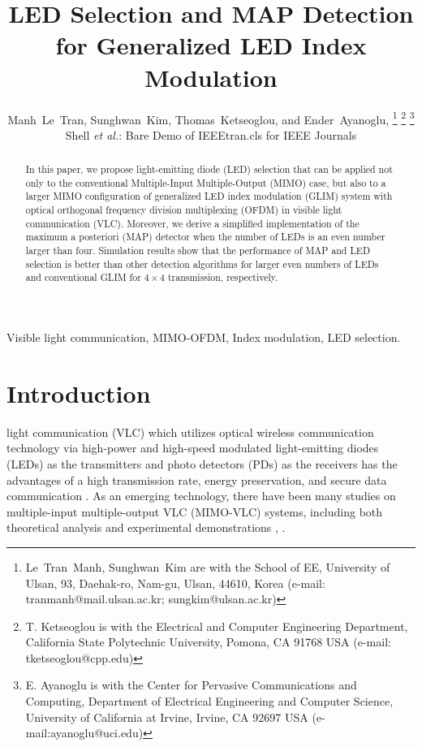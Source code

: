 \documentclass[12pt,letterpaper]{IEEEtran}
\begin{document}
	\title{LED Selection and MAP Detection for Generalized LED Index Modulation }
\author{Manh~Le~Tran, Sunghwan~Kim, Thomas~Ketseoglou,  and Ender~Ayanoglu, %
	\thanks{Le~Tran~Manh, Sunghwan~Kim are with  the  School  of  EE,  University  of  Ulsan,  93, Daehak-ro, Nam-gu, Ulsan, 44610, Korea (e-mail: tranmanh@mail.ulsan.ac.kr; sungkim@ulsan.ac.kr)}%
	\thanks{T. Ketseoglou is with the Electrical and Computer Engineering Department, California State Polytechnic University, Pomona, CA 91768 USA (e-mail: tketseoglou@cpp.edu)}%
	\thanks{E. Ayanoglu is with the Center for Pervasive Communications and Computing, Department of Electrical Engineering and Computer Science, University of California at Irvine, Irvine, CA 92697 USA (e-mail:ayanoglu@uci.edu)}%
	
	{Shell \MakeLowercase{\textit{et al.}}: Bare Demo of IEEEtran.cls for IEEE Journals}}	
\maketitle	
\begin{abstract}
In this paper, we propose light-emitting diode (LED) selection that can be applied not only to the conventional Multiple-Input Multiple-Output (MIMO) case, but also to a larger MIMO configuration of generalized LED index modulation (GLIM) system with optical orthogonal frequency division multiplexing (OFDM) in visible light communication (VLC). Moreover, we derive a simplified implementation of the maximum a posteriori (MAP) detector when the number of LEDs is an even number larger than four. Simulation results show that the performance of MAP and LED selection is better than other detection algorithms for larger even numbers of LEDs and conventional GLIM for $4\times4$ transmission, respectively.
\end{abstract}
\begin{IEEEkeywords}
	Visible light communication, MIMO-OFDM, Index modulation, LED selection.
\end{IEEEkeywords}
\IEEEpeerreviewmaketitle
\section{Introduction}
 light communication (VLC) which utilizes optical wireless communication technology via high-power and high-speed modulated light-emitting diodes (LEDs) as the transmitters and photo detectors (PDs) as the receivers has the advantages of a high transmission rate, energy preservation, and secure data communication \cite{komine_fundamental_2004}. As an emerging technology, there have been many studies on multiple-input multiple-output VLC (MIMO-VLC) systems, including both theoretical analysis and experimental demonstrations \cite{zeng_high_2009}, \cite{fath_performance_2013}.
\end{document}
